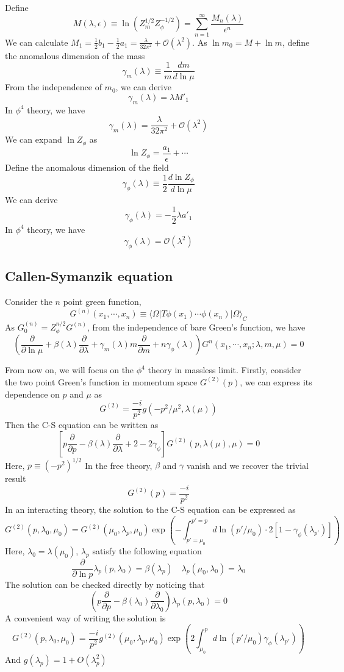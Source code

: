 Define
\[M(\lambda,\epsilon) \equiv \ln(Z_{m}^{1/2} Z_{\phi}^{-1/2}) = \sum_{n=1}^{\infty} \frac{M_n(\lambda)}{\epsilon^n}\]
We can calculate $M_1 = \frac{1}{2}b_1 - \frac{1}{2}a_1 = \frac{\lambda}{32\pi^2} + \mathcal{O}(\lambda^2)$.
As $\ln m_0 = M + \ln m $, define the anomalous dimension of the mass
\[\gamma_m(\lambda) \equiv \frac{1}{m} \frac{dm}{d \ln \mu}\]
From the independence of $m_0$, we can derive
\[\gamma_m(\lambda) = \lambda M'_1\]
In $\phi^4$ theory, we have
\[\gamma_m(\lambda) = \frac{\lambda}{32\pi^2} + \mathcal{O}(\lambda^2)\]
We can expand $\ln Z_{\phi}$ as
\[\ln Z_{\phi} = \frac{a_1}{\epsilon} + \cdots\]
Define the anomalous dimension of the field
\[\gamma_{\phi}(\lambda) \equiv \frac{1}{2} \frac{d\ln Z_{\phi}}{d \ln \mu}\]
We can derive
\[\gamma_{\phi}(\lambda) = -\frac{1}{2}\lambda a'_1\]
In $\phi^4$ theory, we have
\[\gamma_{\phi}(\lambda) = \mathcal{O}(\lambda^2)\]

\subsection{Callen-Symanzik equation}
Consider the $n$ point green function,
\[G^{(n)}(x_1,\cdots,x_n) \equiv \langle \Omega | T \phi(x_1) \cdots \phi(x_n) | \Omega \rangle_C \]
As $G^{(n)}_0 = Z_{\phi}^{n/2} G^{(n)}$, from the independence of bare Green's function, we have
\[\left( \frac{\partial}{\partial \ln \mu} + \beta(\lambda)  \frac{\partial}{\partial \lambda} + \gamma_m(\lambda) m  \frac{\partial}{\partial m} + n \gamma_{\phi}(\lambda)\right)G^{n}(x_1,\cdots,x_n;\lambda,m,\mu) = 0\]

From now on, we will focus on the $\phi^4$ theory in massless limit. Firstly, consider the two point Green's function in momentum space $G^{(2)}(p)$, we can express its dependence on $p$ and $\mu$ as
\[G^{(2)} = \frac{-i}{p^2} g(-p^2/\mu^2,\lambda(\mu))\]
Then the C-S equation can be written as
\[\left[ p \frac{\partial}{\partial p} - \beta(\lambda)  \frac{\partial}{\partial \lambda} +2 - 2\gamma_{\phi}\right ] G^{(2)}(p,\lambda(\mu),\mu) = 0 \]
Here, $p \equiv (-p^2)^{1/2}$
In the free theory, $\beta$ and $\gamma$ vanish and we recover the trivial result
\[G^{(2)}(p) = \frac{-i}{p^2}\]
In an interacting theory, the solution to the C-S equation can be expressed as
\[G^{(2)}(p,\lambda_0,\mu_0) = G^{(2)}(\mu_0,\lambda_p,\mu_0)\exp \left (-\int_{p'=\mu_0}^{p'=p} d \ln(p'/\mu_0) \cdot 2[1-\gamma_{\phi}(\lambda_{p'})] \right )\]
Here, $\lambda_0 = \lambda(\mu_0)$, $\lambda_p$ satisfy the following equation
\[\frac{\partial}{\partial \ln p} \lambda_p(p,\lambda_0) = \beta(\lambda_p) \quad \lambda_p(\mu_0,\lambda_0) = \lambda_0\]
The solution can be checked directly by noticing that
\[\left ( p \frac{\partial}{\partial p} - \beta(\lambda_0) \frac{\partial}{\partial \lambda_0} \right ) \lambda_p(p,\lambda_0) = 0\]
A convenient way of writing the solution is
\[G^{(2)}(p,\lambda_0,\mu_0) =  \frac{-i}{p^2} g^{(2)}(\mu_0,\lambda_p,\mu_0)\exp \left (2\int_{\mu_0}^{p} d \ln(p'/\mu_0)  \gamma_{\phi}(\lambda_{p'}) \right )\]
And $g(\lambda_p) = 1 + O(\lambda_p^2)$

